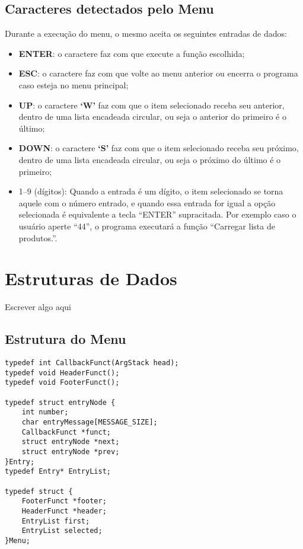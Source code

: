 \documentclass[12pt, a4paper]{article}
\begin{document}
\subsection{Caracteres detectados pelo Menu}\label{Caracteres detectados pelo Menu}
Durante a execução do menu, o mesmo aceita os seguintes entradas de dados:
\begin{itemize}
    \item \textbf{ENTER}\@: o caractere faz com que execute a função escolhida;
    \item \textbf{ESC}\@: o caractere faz com que volte ao menu anterior ou encerra o programa caso esteja no menu principal;
        \item \textbf{UP}\@: o caractere \textbf{`W'} faz com que o item selecionado receba seu anterior, dentro de uma lista encadeada circular, ou seja o anterior do primeiro é o último;
        \item \textbf{DOWN}\@: o caractere \textbf{`S'} faz com que o item selecionado receba seu próximo, dentro de uma lista encadeada circular, ou seja o próximo do último é o primeiro;
    \item 1--9 (dígitos): Quando a entrada é um dígito, o item selecionado se torna aquele com o número entrado, e quando essa entrada for igual a opção selecionada é equivalente a tecla ``ENTER'' supracitada. Por exemplo caso o usuário aperte ``44'', o programa executará a função ``Carregar lista de produtos.''.
\end{itemize}

\section{Estruturas de Dados}\label{Estruturas de Dados}
Escrever algo aqui
\subsection{Estrutura do Menu}\label{Estrutura do Menu}
\begin{lstlisting}
typedef int CallbackFunct(ArgStack head);
typedef void HeaderFunct();
typedef void FooterFunct();

typedef struct entryNode {
    int number;
	char entryMessage[MESSAGE_SIZE];
    CallbackFunct *funct;
    struct entryNode *next;
    struct entryNode *prev;
}Entry;
typedef Entry* EntryList;

typedef struct {
    FooterFunct *footer;
    HeaderFunct *header;
    EntryList first;
    EntryList selected;
}Menu;
\end{lstlisting}
\end{document}
